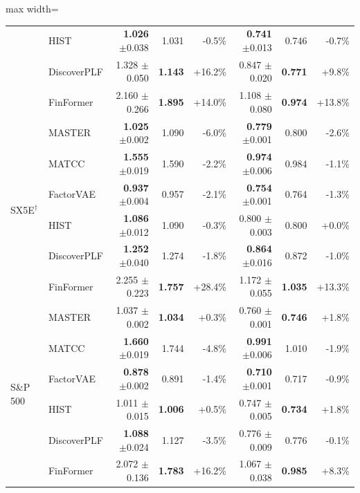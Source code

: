 \begin{table}[tb]
\begin{adjustbox}{max width=\textwidth}
{\begin{tabular}{llrrrrrr}
 & HIST & \textbf{1.026} {\scriptsize$\pm$0.038} & 1.031 & -0.5\% & \textbf{0.741} {\scriptsize$\pm$0.013} & 0.746 & -0.7\% \\
 & DiscoverPLF & 1.328 {\scriptsize$\pm$0.050} & \textbf{1.143} & +16.2\% & 0.847 {\scriptsize$\pm$0.020} & \textbf{0.771} & +9.8\% \\
 & FinFormer & 2.160 {\scriptsize$\pm$0.266} & \textbf{1.895} & +14.0\% & 1.108 {\scriptsize$\pm$0.080} & \textbf{0.974} & +13.8\% \\
\midrule
\multirow{6}{*}{SX5E$^\dagger$} & MASTER & \textbf{1.025} {\scriptsize$\pm$0.002} & 1.090 & -6.0\% & \textbf{0.779} {\scriptsize$\pm$0.001} & 0.800 & -2.6\% \\
 & MATCC & \textbf{1.555} {\scriptsize$\pm$0.019} & 1.590 & -2.2\% & \textbf{0.974} {\scriptsize$\pm$0.006} & 0.984 & -1.1\% \\
 & FactorVAE & \textbf{0.937} {\scriptsize$\pm$0.004} & 0.957 & -2.1\% & \textbf{0.754} {\scriptsize$\pm$0.001} & 0.764 & -1.3\% \\
 & HIST & \textbf{1.086} {\scriptsize$\pm$0.012} & 1.090 & -0.3\% & 0.800 {\scriptsize$\pm$0.003} & 0.800 & +0.0\% \\
 & DiscoverPLF & \textbf{1.252} {\scriptsize$\pm$0.040} & 1.274 & -1.8\% & \textbf{0.864} {\scriptsize$\pm$0.016} & 0.872 & -1.0\% \\
 & FinFormer & 2.255 {\scriptsize$\pm$0.223} & \textbf{1.757} & +28.4\% & 1.172 {\scriptsize$\pm$0.055} & \textbf{1.035} & +13.3\% \\
\midrule
\multirow{6}{*}{S\&P 500} & MASTER & 1.037 {\scriptsize$\pm$0.002} & \textbf{1.034} & +0.3\% & 0.760 {\scriptsize$\pm$0.001} & \textbf{0.746} & +1.8\% \\
 & MATCC & \textbf{1.660} {\scriptsize$\pm$0.019} & 1.744 & -4.8\% & \textbf{0.991} {\scriptsize$\pm$0.006} & 1.010 & -1.9\% \\
 & FactorVAE & \textbf{0.878} {\scriptsize$\pm$0.002} & 0.891 & -1.4\% & \textbf{0.710} {\scriptsize$\pm$0.001} & 0.717 & -0.9\% \\
 & HIST & 1.011 {\scriptsize$\pm$0.015} & \textbf{1.006} & +0.5\% & 0.747 {\scriptsize$\pm$0.005} & \textbf{0.734} & +1.8\% \\
 & DiscoverPLF & \textbf{1.088} {\scriptsize$\pm$0.024} & 1.127 & -3.5\% & 0.776 {\scriptsize$\pm$0.009} & 0.776 & -0.1\% \\
 & FinFormer & 2.072 {\scriptsize$\pm$0.136} & \textbf{1.783} & +16.2\% & 1.067 {\scriptsize$\pm$0.038} & \textbf{0.985} & +8.3\% \\

\end{tabular}}
\end{adjustbox}
\end{table}
